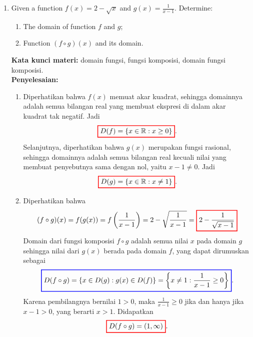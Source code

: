 \documentclass[10pt,openany,a4paper]{article}
\theoremstyle{definition}
\theoremstyle{definition}
\theoremstyle{plain}
\newenvironment{jawab}[2][tes]{%
\par\noindent\textbf{Kata kunci materi:} #1.\\
\textbf{Penyelesaian:} #2%
}{}
\begin{document}
\begin{enumerate}
    \item Given a function \(f(x) = 2 - \sqrt{x}\) and \(g(x) = \frac{1}{x-1}\). Determine:
    \begin{enumerate}
        \item[a)] The domain of function \(f\) and \(g\);
        \item[b)] Function \((f \circ g)(x)\) and its domain.
    \end{enumerate}
    \begin{jawab}[domain fungsi, fungsi komposisi, domain fungsi komposisi]{
        \begin{enumerate}
            \item Diperhatikan bahwa $f(x)$ memuat akar kuadrat, sehingga domainnya adalah semua bilangan real yang membuat ekspresi di dalam akar kuadrat tak negatif. Jadi
            \begin{align*}
                \colorlet{oldcolor}{.}
        \color{red}
        \setlength{\fboxrule}{1pt} \boxed{\color{oldcolor}D(f)=\{x \in \mathbb{R} : x \geq 0\}}\color{oldcolor}.
            \end{align*}
            Selanjutnya, diperhatikan bahwa $g(x)$ merupakan fungsi rasional, sehingga domainnya adalah semua bilangan real kecuali nilai yang membuat penyebutnya sama dengan nol, yaitu $x-1\neq 0$. Jadi
            \begin{align*}
                \colorlet{oldcolor}{.}
        \color{red}
        \setlength{\fboxrule}{1pt} \boxed{\color{oldcolor}D(g)=\{x \in \mathbb{R} : x \neq 1\}}\color{oldcolor}.
            \end{align*}
            \item Diperhatikan bahwa
            \begin{align*}
                (f\circ g)(x) = f(g(x)) = f\left(\frac{1}{x-1}\right) = 2 - \sqrt{\frac{1}{x-1}} = \colorlet{oldcolor}{.}
        \color{red}
        \setlength{\fboxrule}{1pt} \boxed{\color{oldcolor}2 - \frac{1}{\sqrt{x-1}}}\color{oldcolor}
            \end{align*}
            Domain dari fungsi komposisi $f\circ g$ adalah semua nilai $x$ pada domain $g$ sehingga nilai dari $g(x)$ berada pada domain $f$, yang dapat dirumuskan sebagai
            \begin{align*}
                \colorlet{oldcolor}{.}
        \color{blue}
        \setlength{\fboxrule}{1pt} \boxed{\color{oldcolor}D(f\circ g) = \{x \in D(g) : g(x) \in D(f)\} = \left\{x \neq 1 : \frac{1}{x-1} \geq 0\right\}}\color{oldcolor}.
            \end{align*}
            Karena pembilangnya bernilai $1>0$, maka $\frac{1}{x-1} \geq 0$ jika dan hanya jika $x-1 > 0$, yang berarti $x > 1$. Didapatkan
            \begin{align*}
                \colorlet{oldcolor}{.}
        \color{red}
        \setlength{\fboxrule}{1pt} \boxed{\color{oldcolor}D(f\circ g) = (1, \infty)}\color{oldcolor}.
            \end{align*}
        \end{enumerate}
    }
    \end{jawab}


\end{enumerate}
\end{document}
